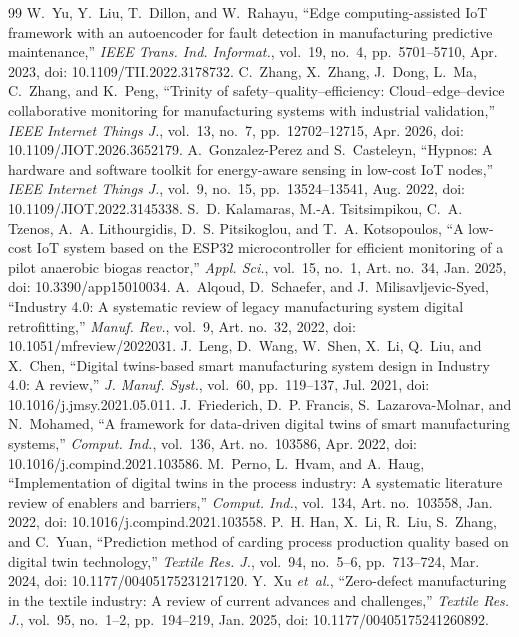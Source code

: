 \documentclass[journal]{IEEEtran}
\begin{document}
\begin{thebibliography}{99}
 W.~Yu, Y.~Liu, T.~Dillon, and W.~Rahayu, ``Edge computing-assisted IoT framework with an autoencoder for fault detection in manufacturing predictive maintenance,'' \emph{IEEE Trans. Ind. Informat.}, vol.~19, no.~4, pp.~5701--5710, Apr. 2023, doi: 10.1109/TII.2022.3178732.
 C.~Zhang, X.~Zhang, J.~Dong, L.~Ma, C.~Zhang, and K.~Peng, ``Trinity of safety--quality--efficiency: Cloud--edge--device collaborative monitoring for manufacturing systems with industrial validation,'' \emph{IEEE Internet Things J.}, vol.~13, no.~7, pp.~12702--12715, Apr. 2026, doi: 10.1109/JIOT.2026.3652179.
 A.~Gonzalez-Perez and S.~Casteleyn, ``Hypnos: A hardware and software toolkit for energy-aware sensing in low-cost IoT nodes,'' \emph{IEEE Internet Things J.}, vol.~9, no.~15, pp.~13524--13541, Aug. 2022, doi: 10.1109/JIOT.2022.3145338.
 S.~D. Kalamaras, M.-A. Tsitsimpikou, C.~A. Tzenos, A.~A. Lithourgidis, D.~S. Pitsikoglou, and T.~A. Kotsopoulos, ``A low-cost IoT system based on the ESP32 microcontroller for efficient monitoring of a pilot anaerobic biogas reactor,'' \emph{Appl. Sci.}, vol.~15, no.~1, Art. no.~34, Jan. 2025, doi: 10.3390/app15010034.
 A.~Alqoud, D.~Schaefer, and J.~Milisavljevic-Syed, ``Industry 4.0: A systematic review of legacy manufacturing system digital retrofitting,'' \emph{Manuf. Rev.}, vol.~9, Art. no.~32, 2022, doi: 10.1051/mfreview/2022031.
 J.~Leng, D.~Wang, W.~Shen, X.~Li, Q.~Liu, and X.~Chen, ``Digital twins-based smart manufacturing system design in Industry 4.0: A review,'' \emph{J. Manuf. Syst.}, vol.~60, pp.~119--137, Jul. 2021, doi: 10.1016/j.jmsy.2021.05.011.
 J.~Friederich, D.~P. Francis, S.~Lazarova-Molnar, and N.~Mohamed, ``A framework for data-driven digital twins of smart manufacturing systems,'' \emph{Comput. Ind.}, vol.~136, Art. no.~103586, Apr. 2022, doi: 10.1016/j.compind.2021.103586.
 M.~Perno, L.~Hvam, and A.~Haug, ``Implementation of digital twins in the process industry: A systematic literature review of enablers and barriers,'' \emph{Comput. Ind.}, vol.~134, Art. no.~103558, Jan. 2022, doi: 10.1016/j.compind.2021.103558.
 P.~H. Han, X.~Li, R.~Liu, S.~Zhang, and C.~Yuan, ``Prediction method of carding process production quality based on digital twin technology,'' \emph{Textile Res. J.}, vol.~94, no.~5--6, pp.~713--724, Mar. 2024, doi: 10.1177/00405175231217120.
 Y.~Xu \emph{et~al.}, ``Zero-defect manufacturing in the textile industry: A review of current advances and challenges,'' \emph{Textile Res. J.}, vol.~95, no.~1--2, pp.~194--219, Jan. 2025, doi: 10.1177/00405175241260892.

\end{thebibliography}
\end{document}
